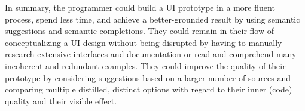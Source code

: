 In summary, the programmer could build a UI prototype in a more fluent process, spend less time, and achieve a better-grounded result by using semantic suggestions and semantic completions.
They could remain in their flow of conceptualizing a UI design without being disrupted by having to manually research extensive interfaces and documentation or read and comprehend many incoherent and redundant examples.
They could improve the quality of their prototype by considering suggestions based on a larger number of sources and comparing multiple distilled, distinct options with regard to their inner (code) quality and their visible effect.
